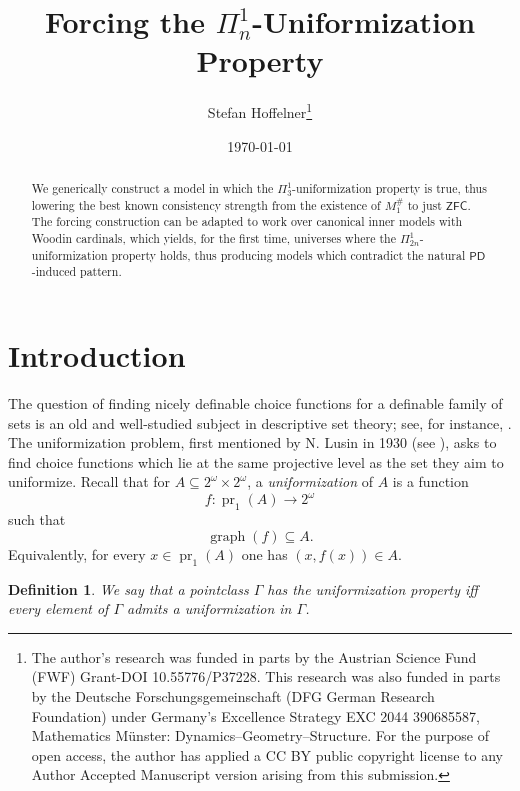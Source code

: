 \documentclass[a4paper,11pt]{article}
\title{Forcing the ${\Pi^1_n}$-Uniformization Property}
\author{Stefan Hoffelner\footnote{The author's research was funded in parts by the Austrian Science Fund (FWF) Grant-DOI 10.55776/P37228. This research was also funded in parts by the Deutsche Forschungsgemeinschaft (DFG German Research Foundation) under Germany's Excellence Strategy EXC 2044 390685587, Mathematics M\"unster: Dynamics--Geometry--Structure. For the purpose of open access, the author has applied a CC BY public copyright license to any Author Accepted Manuscript version arising from this submission. } }
\date{\today}
\newtheorem{definition}[theorem]{Definition}
\newcommand{\ZFC}{\mathsf{ZFC}}
\newcommand{\PD}{\mathsf{PD}}
\begin{document}
\maketitle

\begin{abstract}
We generically construct a model in which the ${\Pi^1_3}$-uniformization property is true, thus lowering the best known consistency strength from the existence of $M_1^{\#}$ to just $\ZFC$. The forcing construction can be adapted to work over canonical inner models with Woodin cardinals, which yields, for the first time, universes where the $\Pi^1_{2n}$-uniformization property holds, thus producing models which contradict the natural $\PD$-induced pattern.

\end{abstract}

\section{Introduction}
The question of finding nicely definable 
choice functions for a definable family of sets is an old and well-studied subject in descriptive set theory; see, for instance, \cite{Kechris,Moschovakis}. The uniformization problem, first mentioned by N. Lusin in 1930 (see \cite{Lusin}), asks to find choice functions which lie at the same projective level as the set they aim to uniformize.
Recall that for $A\subseteq 2^{\omega}\times 2^{\omega}$, a
\emph{uniformization} of $A$ is a function
\[
   f:\operatorname{pr}_1(A)\longrightarrow 2^\omega
\]
such that
\[
   \operatorname{graph}(f)\subseteq A.
\]
Equivalently, for every $x\in\operatorname{pr}_1(A)$ one has
$(x,f(x))\in A$.


\begin{definition}
 We say that a pointclass $\Gamma$ has the uniformization
 property iff every element of $\Gamma$ admits a uniformization 
 in $\Gamma$.
\end{definition}
\end{document}
